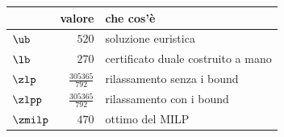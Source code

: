 \begin{center}\small
\begin{tabular}{lrl}
\toprule
 & valore & che cos'è \\
\midrule
$\ub$ & $520$ & soluzione euristica \\
$\lb$ & $270$ & certificato duale costruito a mano \\
$\zlp$ & $\frac{305365}{792}$ & rilassamento senza i bound \\
$\zlpp$ & $\frac{305365}{792}$ & rilassamento con i bound \\
$\zmilp$ & $470$ & ottimo del MILP \\
\bottomrule
\end{tabular}
\end{center}

